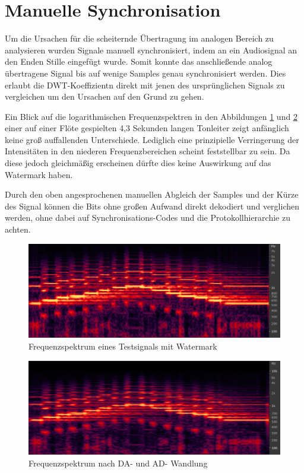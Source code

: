 \section{Manuelle Synchronisation}

Um die Ursachen für die scheiternde Übertragung im analogen Bereich zu analysieren wurden Signale manuell synchronisiert, indem an ein Audiosignal an den Enden Stille eingefügt wurde. Somit konnte das anschließende analog übertragene Signal bis auf wenige Samples genau synchronisiert werden. Dies erlaubt die DWT-Koeffizientn direkt mit jenen des ursprünglichen Signals zu vergleichen um den Ursachen auf den Grund zu gehen. 

Ein Blick auf die logarithmischen Frequenzspektren in den Abbildungen \ref{fig:spektrum-original} und \ref{fig:spektrum-soundkarte} einer auf einer Flöte gespielten 4,3 Sekunden langen Tonleiter zeigt anfänglich keine groß auffallenden Unterschiede. Lediglich eine prinzipielle Verringerung der Intensitäten in den niederen Frequenzbereichen scheint feststellbar zu sein. Da diese jedoch gleichmäßig erscheinen dürfte dies keine Auswirkung auf das Watermark haben. 

Durch den oben angesprochenen manuellen Abgleich der Samples und der Kürze des Signal können die Bits ohne großen Aufwand direkt dekodiert und verglichen werden, ohne dabei auf Synchronisations-Codes und die Protokollhierarchie zu achten.

\newpage

\begin{figure}[h]
	\centering
	\includegraphics[width=\textwidth]{figures/spektrum-original.png}
	\caption{Frequenzspektrum eines Testsignals mit Watermark}
	\label{fig:spektrum-original}
\end{figure}

\begin{figure}[h]
	\centering
	\includegraphics[width=\textwidth]{figures/spektrum-soundkarte.png}
	\caption{Frequenzspektrum nach DA- und AD- Wandlung}
	\label{fig:spektrum-soundkarte}
\end{figure}




